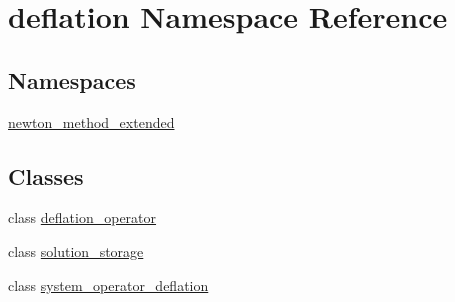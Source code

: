 \hypertarget{namespacedeflation}{\section{deflation Namespace Reference}
\label{namespacedeflation}
}
\subsection*{Namespaces}
\begin{DoxyCompactItemize}
\item 
\hyperlink{namespacedeflation_1_1newton__method__extended}{newton\-\_\-method\-\_\-extended}
\end{DoxyCompactItemize}
\subsection*{Classes}
\begin{DoxyCompactItemize}
\item 
class \hyperlink{classdeflation_1_1deflation__operator}{deflation\-\_\-operator}
\item 
class \hyperlink{classdeflation_1_1solution__storage}{solution\-\_\-storage}
\item 
class \hyperlink{classdeflation_1_1system__operator__deflation}{system\-\_\-operator\-\_\-deflation}
\end{DoxyCompactItemize}
